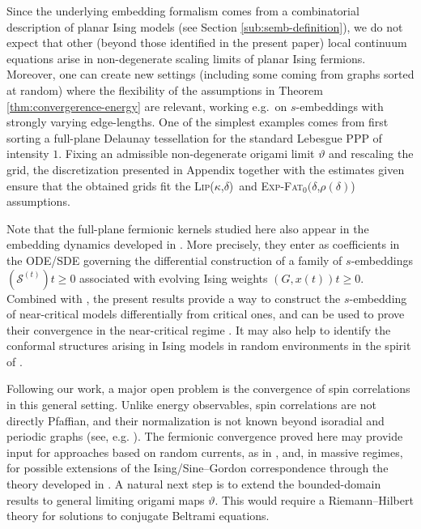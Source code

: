 \documentclass[reqno]{amsart}
\numberwithin{equation}{section}
\theoremstyle{definition}
\theoremstyle{remark}
\def\LipKd{{\mbox{\textsc{Lip(}$\kappa$\textsc{,}$\delta$\textsc{)}}}}
\def\ExpFat{{{\mbox{\textsc{Exp-Fat}$_0(\delta$\textsc{,}$\rho(\delta)$\textsc{)}}}}}
\begin{document}
Since the underlying embedding formalism comes from a combinatorial description of planar Ising models (see Section \ref{sub:semb-definition}), we do not expect that other (beyond those identified in the present paper) local continuum equations arise in non-degenerate scaling limits of planar Ising fermions. Moreover, one can create new settings (including some coming from graphs sorted at random) where the flexibility of the assumptions in Theorem \ref{thm:convergerence-energy} are relevant, working e.g.\ on $s$-embeddings with strongly varying edge-lengths. One of the simplest examples comes from first sorting a full-plane Delaunay tessellation for the standard Lebesgue PPP of intensity $1$. Fixing an admissible non-degenerate origami limit $\vartheta$ and rescaling the grid, the discretization presented in Appendix together with the estimates given \cite[Section 1.2.2]{bou2024random} ensure that the obtained grids fit the \LipKd\, and \ExpFat\, assumptions.
\medskip

Note that the full-plane fermionic kernels studied here also appear in the embedding dynamics developed in \cite[Section 4]{Mah25}. More precisely, they enter as coefficients in the ODE/SDE governing the differential construction of a family of $s$-embeddings $(\mathcal S^{(t)}){t\geq 0}$ associated with evolving Ising weights $(G,x(t)){t\geq 0}$. Combined with \cite{Mah25}, the present results provide a way to construct the $s$-embedding of near-critical models differentially from critical ones, and can be used to prove their convergence in the near-critical regime \cite{AriMah}. It may also help to identify the conformal structures arising in Ising models in random environments in the spirit of \cite[Section 5]{Mah25}. 


Following our work, a major open problem is the convergence of spin correlations in this general setting. Unlike energy observables, spin correlations are not directly Pfaffian, and their normalization is not known beyond isoradial and periodic graphs (see, e.g. \cite{mccoy-wu-book,Cim-universality,Che20,Mah25b}). The fermionic convergence proved here may provide input for approaches based on random currents, as in \cite{duminil2025conformal}, and, in massive regimes, for possible extensions of the Ising/Sine–Gordon correspondence through the theory developed in \cite{park2025near}. A natural next step is to extend the bounded-domain results to general limiting origami maps $\vartheta$. This would require a Riemann–Hilbert theory for solutions to conjugate Beltrami equations.
\end{document}
